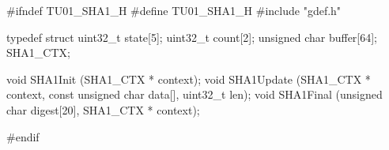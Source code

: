 \code
#ifndef TU01_SHA1_H
#define TU01_SHA1_H
#include "gdef.h"


typedef struct
{
   uint32_t state[5];
   uint32_t count[2];
   unsigned char buffer[64];
} SHA1_CTX;


void SHA1Init (SHA1_CTX * context);
void SHA1Update (SHA1_CTX * context, const unsigned char data[], uint32_t len);
void SHA1Final (unsigned char digest[20], SHA1_CTX * context);

#endif
\endcode
